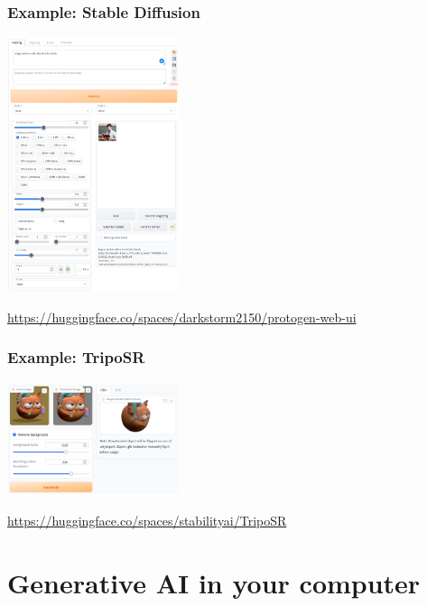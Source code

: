 \documentclass[17pt,aspectratio=169,hyperref={pdfusetitle,colorlinks,allcolors=olive}]{beamer}
\begin{document}
\begin{frame}[fragile]
\frametitle{Example: Stable Diffusion}

\begin{center}
  \includegraphics[width=5cm]{figs/protogen-webui}
\end{center}

\begin{flushright}
  {\small
    \url{https://huggingface.co/spaces/darkstorm2150/protogen-web-ui}
  }
\end{flushright}
\end{frame}

\begin{frame}[fragile]
\frametitle{Example: TripoSR}

\begin{center}
  \includegraphics[width=5cm]{figs/triposr}
\end{center}

\begin{flushright}
  {\small
    \url{https://huggingface.co/spaces/stabilityai/TripoSR}
  }
\end{flushright}
\end{frame}

\section{Generative AI in your computer}
\end{document}

